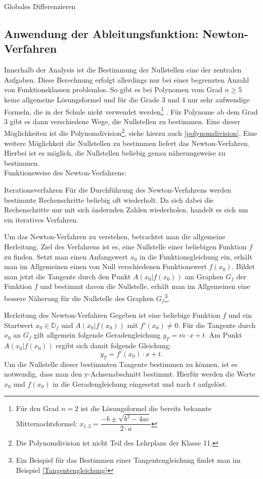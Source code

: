 \begin{section}{Globales Differenzieren}
\subsection{Anwendung der Ableitungsfunktion: Newton-Verfahren}

Innerhalb der Analysis ist die Bestimmung der Nullstellen eine der zentralen Aufgaben. Diese Berechnung erfolgt allerdings nur bei einer begrenzten Anzahl von Funktionsklassen problemlos. So gibt es bei Polynomen vom Grad $n\geq 5$ keine allgemeine Lösungsformel und für die Grade 3 und 4 nur sehr aufwendige Formeln, die in der Schule nicht verwendet werden\footnote{Für den Grad $n=2$ ist die Lösungsformel die bereits bekannte Mitternachtsformel: $x_{1,2} = \dfrac{-b\pm \sqrt{b^2 -4ac}}{2\cdot a}$} . Für Polynome ab dem Grad $3$ gibt es dann verschiedene Wege, die Nullstellen zu bestimmen. Eine dieser Möglichkeiten ist die Polynomdivision\footnote{Die Polynomdivision ist nicht Teil des Lehrplans der Klasse 11.}, siehe hierzu auch \ref{polynomdivision}. Eine weitere Möglichkeit die Nullstellen zu bestimmen liefert das Newton-Verfahren. Hierbei ist es möglich, die Nullstellen beliebig genau näherungsweise zu bestimmen. \\
Funktionsweise des Newton-Verfahrens:
\begin{merke*}{Iterationsverfahren}
  Für die Durchführung des Newton-Verfahrens werden bestimmte Rechenschritte beliebig oft wiederholt. Da sich dabei die Rechenschritte nur mit sich ändernden Zahlen wiederholen, handelt es sich um ein iteratives Verfahren.
\end{merke*}
Um das Newton-Verfahren zu verstehen, betrachtet man die allgemeine Herleitung. Ziel des Verfahrens ist es, eine Nullstelle einer beliebigen Funktion $f$ zu finden. Setzt man einen Anfangswert $x_0$ in die Funktionsgleichung ein, erhält man im Allgemeinen einen von Null verschiedenen Funktionswert $f(x_0)$. Bildet man jetzt die Tangente durch den Punkt $A(x_0|f(x_0))$ am Graphen $G_f$ der Funktion $f$ und bestimmt davon die Nullstelle, erhält man im Allgemeinen eine bessere Näherung für die Nullstelle des Graphen $G_f$\footnote{Ein Beispiel für das Bestimmen einer Tangentengleichung findet man im Beispiel \ref{Tangentengleichung}}. 
\begin{bsp*}{Herleitung des Newton-Verfahren}
    Gegeben ist eine beliebige Funktion $f$ und ein Startwert $x_0 \in \mathds{D}_f$ und $A(x_0|f(x_0))$ mit $f'(x_0)\neq 0$. Für die Tangente durch $x_0$ an $G_f$ gilt allgemein folgende Geradengleichung $y_T= m\cdot x + t$. Am Punkt $A(x_0|f(x_0))$ ergibt sich damit folgende Gleichung:$$y_T = f'(x_0) \cdot x + t.$$ Um die Nullstelle dieser bestimmten Tangente bestimmen zu können, ist es notwendig, dass man den y-Achsenabschnitt bestimmt. Hierfür werden die Werte $x_0$ und $f(x_0)$ in die Geradengleichung eingesetzt und nach $t$ aufgelöst. 

\end{bsp*}
\end{section}
